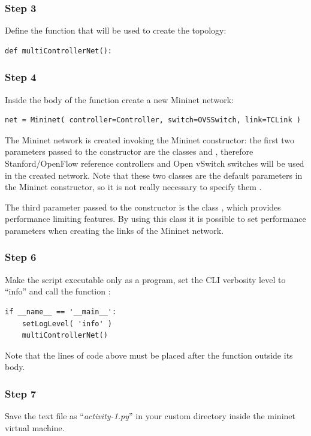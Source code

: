 \subsubsection*{Step 3}
Define the function that will be used to create the topology:
\begin{lstlisting}
def multiControllerNet():
\end{lstlisting}

\subsubsection*{Step 4}
Inside the body of the function  create a new Mininet
network:
\begin{lstlisting}
net = Mininet( controller=Controller, switch=OVSSwitch, link=TCLink )
\end{lstlisting}

The Mininet network is created invoking the Mininet constructor: the first two parameters
passed to the constructor are the classes  and , therefore
Stanford/OpenFlow reference controllers and Open vSwitch switches will be used
in the created network. Note that these two classes are the default parameters in
the Mininet constructor, so it is not really necessary to specify them \cite{ref-4}.

The third parameter passed to the constructor is the class , which provides
performance limiting features. By using this class it is possible to set performance
parameters when creating the links of the Mininet network.

\subsubsection*{Step 6}
Make the script executable only as a program, set the CLI verbosity level to ``info''
and call the function :
\begin{lstlisting}
if __name__ == '__main__':
    setLogLevel( 'info' )
    multiControllerNet()
\end{lstlisting}
Note that the lines of code above must be placed after the function 
outside its body.

\subsubsection*{Step 7}
Save the text file as ``\emph{activity-1.py}'' in your custom directory inside
the mininet virtual machine.





